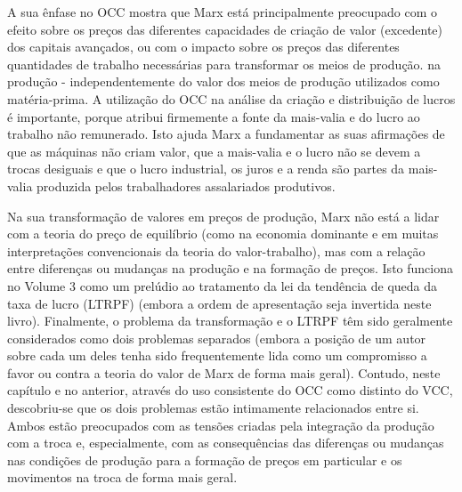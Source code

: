  \par 
A sua ênfase no OCC mostra que Marx está principalmente preocupado com o efeito sobre os preços das diferentes capacidades de criação de valor (excedente) dos capitais avançados, ou com o impacto sobre os preços das diferentes quantidades de trabalho necessárias para transformar os meios de produção. na produção - independentemente do valor dos meios de produção utilizados como matéria-prima. A utilização do OCC na análise da criação e distribuição de lucros é importante, porque atribui firmemente a fonte da mais-valia e do lucro ao trabalho não remunerado. Isto ajuda Marx a fundamentar as suas afirmações de que as máquinas não criam valor, que a mais-valia e o lucro não se devem a trocas desiguais e que o lucro industrial, os juros e a renda são partes da mais-valia produzida pelos trabalhadores assalariados produtivos.
 \par 
Na sua transformação de valores em preços de produção, Marx não está a lidar com a teoria do preço de equilíbrio (como na economia dominante e em muitas interpretações convencionais da teoria do valor-trabalho), mas com a relação entre diferenças ou mudanças na produção e na formação de preços. Isto funciona no Volume {\color{blue}3} como um prelúdio ao tratamento da lei da tendência de queda da taxa de lucro (LTRPF) (embora a ordem de apresentação seja invertida neste livro). Finalmente, o problema da transformação e o LTRPF têm sido geralmente considerados como dois problemas separados (embora a posição de um autor sobre cada um deles tenha sido frequentemente lida como um compromisso a favor ou contra a teoria do valor de Marx de forma mais geral). Contudo, neste capítulo e no anterior, através do uso consistente do OCC como distinto do VCC, descobriu-se que os dois problemas estão intimamente relacionados entre si. Ambos estão preocupados com as tensões criadas pela integração da produção com a troca e, especialmente, com as consequências das diferenças ou mudanças nas condições de produção para a formação de preços em particular e os movimentos na troca de forma mais geral.
 \par 
